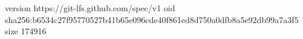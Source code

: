 version https://git-lfs.github.com/spec/v1
oid sha256:b6534c27f95770527b41b65e096cde40f861ed8d750a0dfb8a5e92db99a7a3f5
size 174916
